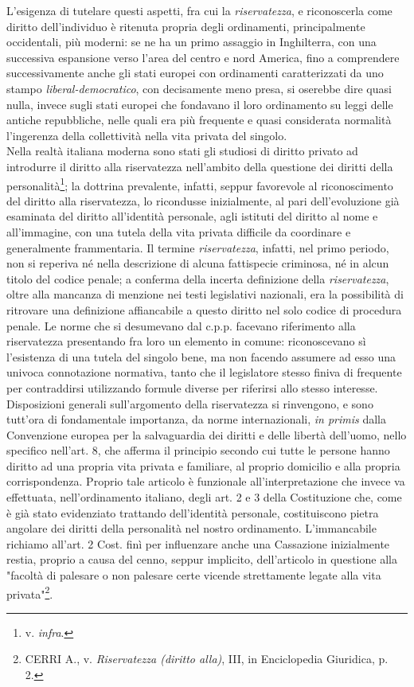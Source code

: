 L'esigenza di tutelare questi aspetti, fra cui la \textit{riservatezza}, e riconoscerla come diritto dell'individuo è ritenuta propria degli ordinamenti, principalmente occidentali, più moderni: se ne ha un primo assaggio in Inghilterra, con una successiva espansione verso l'area del centro e nord America, fino a comprendere successivamente anche gli stati europei con ordinamenti caratterizzati da uno stampo \textit{liberal-democratico}, con decisamente meno presa, si oserebbe dire quasi nulla, invece sugli stati europei che fondavano il loro ordinamento su leggi delle antiche repubbliche, nelle quali era più frequente e quasi considerata normalità l'ingerenza della collettività nella vita privata del singolo.
\\Nella realtà italiana moderna sono stati gli studiosi di diritto privato ad introdurre il diritto alla riservatezza nell'ambito della questione dei diritti della personalità\footnote{v. \textit{infra}.}; la dottrina prevalente, infatti, seppur favorevole al riconoscimento del diritto alla riservatezza, lo ricondusse inizialmente, al pari dell'evoluzione già esaminata del diritto all'identità personale, agli istituti del diritto al nome e all'immagine, con una tutela della vita privata difficile da coordinare e generalmente frammentaria. 
Il termine \textit{riservatezza}, infatti, nel primo periodo, non si reperiva né nella descrizione di alcuna fattispecie criminosa, né in alcun titolo del codice penale; a conferma della incerta definizione della \textit{riservatezza}, oltre alla mancanza di menzione nei testi legislativi nazionali, era la possibilità di ritrovare una definizione affiancabile a questo diritto nel solo codice di procedura penale.%
Le norme che si desumevano dal c.p.p. facevano riferimento alla riservatezza presentando fra loro un elemento in comune: riconoscevano sì l'esistenza di una tutela del singolo bene, ma non facendo assumere ad esso una univoca connotazione normativa, tanto che il legislatore stesso finiva di frequente per contraddirsi utilizzando formule diverse per riferirsi allo stesso interesse.
\\Disposizioni generali sull'argomento della riservatezza si rinvengono, e sono tutt'ora di fondamentale importanza, da norme internazionali, \textit{in primis} dalla Convenzione europea per la salvaguardia dei diritti e delle libertà dell'uomo, nello specifico nell'art. 8, che afferma il principio secondo cui tutte le persone hanno diritto ad una propria vita privata e familiare, al proprio domicilio e alla propria corrispondenza. Proprio tale articolo è funzionale all'interpretazione che invece va effettuata, nell'ordinamento italiano, degli art. 2 e 3 della Costituzione che, come è già stato evidenziato trattando dell'identità personale, costituiscono pietra angolare dei diritti della personalità nel nostro ordinamento. L'immancabile richiamo all'art. 2 Cost. finì per influenzare anche una Cassazione inizialmente restia, proprio a causa del cenno, seppur implicito, dell'articolo in questione alla "facoltà di palesare o non palesare certe vicende strettamente legate alla vita privata"\footnote{CERRI A., v. \textit{Riservatezza (diritto alla)}, III, in Enciclopedia Giuridica, p. 2.}.
